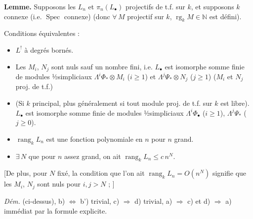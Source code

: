 \documentclass[11pt,a4paper]{article}
\begin{document}
\textbf{Lemme.} Supposons les $L_{n}$ et $\pi_{n}(L_{\bullet})$ projectifs
de t.f. sur $k$, et supposons $k$ connexe (i.e. $\operatorname{Spec}$
connexe) (donc $\forall\, M$ projectif sur $k$, $\operatorname{rg}_{k} M
\in \mathbb{N}$ est défini).

Conditions équivalentes :
\begin{itemize}
  \item[a)] $L^{!}$ à degrés bornés.
  \item[b)]  Les $M_{i}$, $N_{j}$ sont nuls sauf un nombre fini,
  i.e. $L_{\bullet}$ est isomorphe  somme finie de modules
  ½simpliciaux $\Lambda^{i}\Phi_{*} \otimes M_{i}$ ($i \geqslant 1$) et
  $\Lambda^{j}\Psi_{*} \otimes N_{j}$ ($j \geqslant 1$) ($M_{i}$ et $N_{j}$
  proj. de t.f.)
  \item[b')] (Si $k$ principal, plus généralement si tout module proj. de
  t.f. sur $k$ est libre). $L_{\bullet}$ est isomorphe  somme
  finie de modules ½simpliciaux $\Lambda^{i}\Phi_{\bullet}$ ($i \geqslant
  1$), $\Lambda^{j}\Psi_{*}$ ($j \geqslant 0$).
  \item[c)] $\operatorname{rang}_{k} L_{n}$ est une fonction polynomiale en
  $n$ pour $n$ grand.
  \item[d)] $\exists\, N$   que pour $n$ assez
  grand, on ait $\operatorname{rang}_{k} L_{n} \leqslant c\, n^{N}$.
\end{itemize}

[De plus,  pour $N$ fixé, la condition que l'on ait
$\operatorname{rang}_{k} L_{n} = O(n^{N})$ \struck{\ill{}} signifie que les
$M_{i}$, $N_{j}$ sont nuls pour $i, j > N$ ;
]

\emph{Dém.}  (ci-dessus), b)
$\Leftrightarrow$ b') trivial,  c) $\Rightarrow$
d) trivial, a) $\Rightarrow$ c) et d) $\Rightarrow$ a) immédiat par la
formule explicite.
\end{document}
